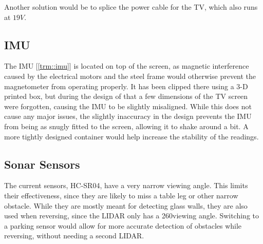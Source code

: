 Another solution would be to splice the power cable for the TV, which also runs at $19V$.


\subsection{IMU}
The IMU [\ref{trm::imu}] is located on top of the screen, as magnetic interference caused by the electrical motors and the steel frame would otherwise prevent the magnetometer from operating properly.
It has been clipped there using a 3-D printed box, but during the design of that a few dimensions of the TV screen were forgotten, causing the IMU to be slightly misaligned.
While this does not cause any major issues, the slightly inaccuracy in the design prevents the IMU from being as snugly fitted to the screen, allowing it to shake around a bit.
A more tightly designed container would help increase the stability of the readings.


\subsection{Sonar Sensors}
The current sensors, HC-SR04, have a very narrow viewing angle.
This limits their effectiveness, since they are likely to miss a table leg or other narrow obstacle.
While they are mostly meant for detecting glass walls, they are also used when reversing, since the LIDAR only has a 260\textdegree viewing angle.
Switching to a parking sensor would allow for more accurate detection of obstacles while reversing, without needing a second LIDAR.

\newpage
